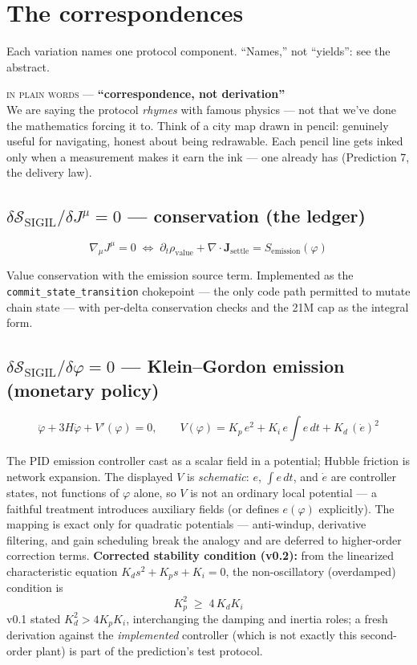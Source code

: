 \documentclass[10pt,a4paper]{article}
\newcommand{\layman}[3]{%
\begin{tcolorbox}[enhanced,
  interior style={left color=#1!9,right color=white},
  colframe=#1!45!slate,boxrule=0.5pt,arc=3pt,
  borderline west={2.5pt}{0pt}{#1},
  left=9pt,right=9pt,top=7pt,bottom=7pt]
{\scriptsize\textcolor{#1}{\textsc{in plain words}}\; — \;\textbf{\small #2}}\\[3pt]
\small #3
\end{tcolorbox}}
\newcommand{\SSIGIL}{\mathcal{S}_{\mathrm{SIGIL}}}
\begin{document}
\section{The correspondences}

Each variation names one protocol component. ``Names,'' not ``yields'': see the abstract.

\layman{sigilviolet}{``correspondence, not derivation''}{We are saying the protocol
\emph{rhymes} with famous physics — not that we've done the mathematics forcing it to.
Think of a city map drawn in pencil: genuinely useful for navigating, honest about
being redrawable. Each pencil line gets inked only when a measurement makes it earn
the ink — one already has (Prediction 7, the delivery law).}

\subsection{$\delta\SSIGIL/\delta J^\mu = 0$ — conservation (the ledger)}

\begin{equation}
\nabla_\mu J^\mu = 0 \;\Longleftrightarrow\;
\partial_t \rho_{\mathrm{value}} + \nabla\!\cdot\!\mathbf{J}_{\mathrm{settle}}
= S_{\mathrm{emission}}(\varphi)
\end{equation}

Value conservation with the emission source term. Implemented as the
\texttt{commit\_state\_transition} chokepoint — the only code path permitted to mutate
chain state — with per-delta conservation checks and the 21M cap as the integral form.

\subsection{$\delta\SSIGIL/\delta\varphi = 0$ — Klein--Gordon emission (monetary policy)}

\begin{equation}
\ddot{\varphi} + 3H\dot{\varphi} + V'(\varphi) = 0,\qquad
V(\varphi) = K_p\,e^2 + K_i\,e\!\!\int\! e\,dt + K_d\,(\dot e)^2
\end{equation}

The PID emission controller cast as a scalar field in a potential; Hubble friction is
network expansion. The displayed $V$ is \emph{schematic}: $e$, $\int e\,dt$, and
$\dot e$ are controller states, not functions of $\varphi$ alone, so $V$ is not an
ordinary local potential — a faithful treatment introduces auxiliary fields (or defines
$e(\varphi)$ explicitly). The mapping is exact only for quadratic potentials —
anti-windup,
derivative filtering, and gain scheduling break the analogy and are deferred to
higher-order correction terms. \textbf{Corrected stability condition (v0.2):} from the
linearized characteristic equation $K_d s^2 + K_p s + K_i = 0$, the non-oscillatory
(overdamped) condition is
\begin{equation}
K_p^2 \;\ge\; 4\,K_d K_i
\end{equation}
v0.1 stated $K_d^2 > 4K_pK_i$, interchanging the damping and inertia roles; a fresh
derivation against the \emph{implemented} controller (which is not exactly this
second-order plant) is part of the prediction's test protocol.
\end{document}
